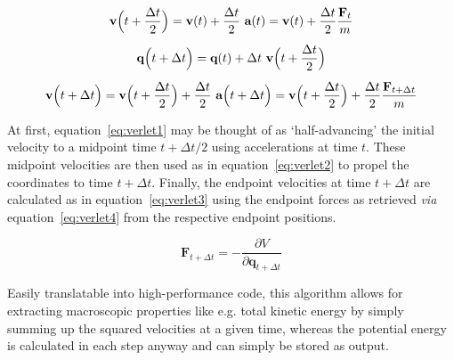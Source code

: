 \documentclass[11pt]{article}
\begin{document}
\begin{gather}
  \textbf{v}\Bigl(t + \frac{\Delta t}{2}\Bigr) = \textbf{v}(t) + \frac{\Delta t}{2}\ \textbf{a}(t) =\textbf{v}(t) + \frac{\Delta t}{2}\frac{\textbf{F}_t}{m}
  \label{eq:verlet1}\\[5pt]
  \textbf{q}\Bigl(t + \Delta t\Bigr) = \textbf{q}(t) + \Delta t\ \textbf{v}\Bigl(t + \frac{\Delta t}{2}\Bigr)
  \label{eq:verlet2}\\[5pt]
  \textbf{v}\Bigl(t + \Delta t\Bigr) = \textbf{v}\Bigl(t + \frac{\Delta t}{2}\Bigr) + \frac{\Delta t}{2}\ \textbf{a}\Bigl(t + \Delta t\Bigr) = \textbf{v}\Bigl(t + \frac{\Delta t}{2}\Bigr) + \frac{\Delta t}{2}\frac{\textbf{F}_{t + \Delta t}}{m}
  \label{eq:verlet3}
\end{gather}

\bigskip

\noindent At first, equation~\ref{eq:verlet1} may be thought of as `half-advancing' the initial velocity to a midpoint time $t + \Delta t/2$ using accelerations at time $t$. These midpoint velocities are then used as in equation~\ref{eq:verlet2} to propel the coordinates to time $t + \Delta t$. Finally, the endpoint velocities at time $t + \Delta t$ are calculated as in equation~\ref{eq:verlet3} using the endpoint forces as retrieved \textit{via} equation~\ref{eq:verlet4} from the respective endpoint positions.

\begin{equation}
  \textbf{F}_{t + \Delta t} = -\frac{\partial{V}}{\partial \textbf{q}_{t + \Delta t}}
  \label{eq:verlet4}
\end{equation}

\bigskip

\noindent Easily translatable into high-performance code, this algorithm allows for extracting macroscopic properties like e.g. total kinetic energy by simply summing up the squared velocities at a given time, whereas the potential energy is calculated in each step anyway and can simply be stored as output.
\end{document}
